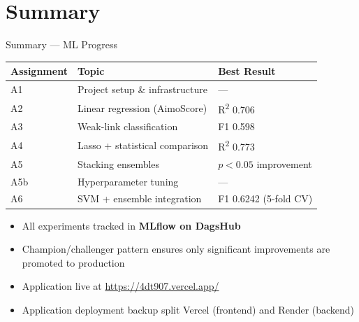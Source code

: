 \documentclass{beamer}
\begin{document}
\section{Summary}

\begin{frame}{Summary --- ML Progress}
    \begin{table}
        \small
        \begin{tabular}{l l l}
            \toprule
            \textbf{Assignment} & \textbf{Topic}    & \textbf{Best Result}          \\
            \midrule
            A1  & Project setup \& infrastructure   & ---                           \\
            A2  & Linear regression (AimoScore)     & R\textsuperscript{2} 0.706    \\
            A3  & Weak-link classification          & F1 0.598                      \\
            A4  & Lasso + statistical comparison    & R\textsuperscript{2} 0.773    \\
            A5  & Stacking ensembles                & $p<0.05$ improvement          \\
            A5b & Hyperparameter tuning             & ---               \\
            A6  & SVM + ensemble integration        & F1 0.6242 (5-fold CV)         \\
            \bottomrule
        \end{tabular}
    \end{table}
    \vspace{0.5em}
    \begin{itemize}
        \item All experiments tracked in \textbf{MLflow on DagsHub}
        \item Champion/challenger pattern ensures only significant improvements
              are promoted to production
        \item Application live at \url{https://4dt907.vercel.app/}
        \item Application deployment backup split Vercel (frontend) and Render (backend)
    \end{itemize}
\end{frame}
\end{document}
